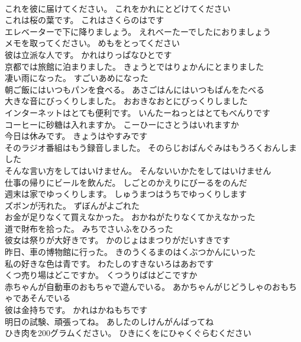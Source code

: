 \documentclass[8pt]{extreport}
\begin{document}
\begin{CJK}{UTF8}{min}
\\	これを彼に届けてください。	これをかれにとどけてください 
\\	これは桜の葉です。	これはさくらのはです 
\\	エレベーターで下に降りましょう。	えれべーたーでしたにおりましょう 
\\	メモを取ってください。	めもをとってください 
\\	彼は立派な人です。	かれはりっぱなひとです 
\\	京都では旅館に泊まりました。	きょうとではりょかんにとまりました 
\\	凄い雨になった。	すごいあめになった 
\\	朝ご飯にはいつもパンを食べる。	あさごはんにはいつもぱんをたべる 
\\	大きな音にびっくりしました。	おおきなおとにびっくりしました 
\\	インターネットはとても便利です。	いんたーねっとはとてもべんりです 
\\	コーヒーに砂糖は入れますか。	こーひーにさとうはいれますか 
\\	今日は休みです。	きょうはやすみです 
\\	そのラジオ番組はもう録音しました。	そのらじおばんぐみはもうろくおんしました 
\\	そんな言い方をしてはいけません。	そんないいかたをしてはいけません 
\\	仕事の帰りにビールを飲んだ。	しごとのかえりにびーるをのんだ 
\\	週末は家でゆっくりします。	しゅうまつはうちでゆっくりします 
\\	ズボンが汚れた。	ずぼんがよごれた 
\\	お金が足りなくて買えなかった。	おかねがたりなくてかえなかった 
\\	道で財布を拾った。	みちでさいふをひろった 
\\	彼女は祭りが大好きです。	かのじょはまつりがだいすきです 
\\	昨日、車の博物館に行った。	きのうくるまのはくぶつかんにいった 
\\	私の好きな色は青です。	わたしのすきないろはあおです 
\\	くつ売り場はどこですか。	くつうりばはどこですか 
\\	赤ちゃんが自動車のおもちゃで遊んでいる。	あかちゃんがじどうしゃのおもちゃであそんでいる 
\\	彼は金持ちです。	かれはかねもちです 
\\	明日の試験、頑張ってね。	あしたのしけんがんばってね 
\\	ひき肉を200グラムください。	ひきにくをにひゃくぐらむください 

\end{CJK}
\end{document}
